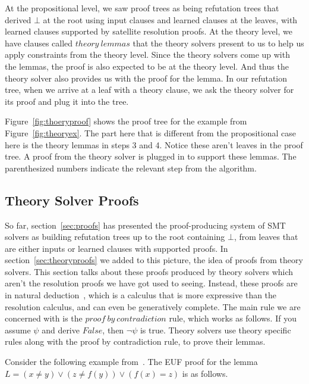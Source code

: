 \documentclass{article}
\begin{document}
At the propositional level, we saw proof trees as being 
refutation trees that derived $\bot$ at the root using
input clauses and learned clauses at the leaves, with 
learned clauses supported by satellite resolution proofs. 
At the theory level, we have clauses called $theory\ lemmas$
that the theory solvers present to us to help us 
apply constraints from the theory level. Since the theory solvers 
come up with the lemmas, the proof is also expected to be 
at the theory level. And thus the theory solver also 
provides us with the proof for the lemma. In our refutation tree,
when we arrive at a leaf with a theory clause, we ask the 
theory solver for its proof and plug it into the tree.

Figure~\ref{fig:thoeryproof} shows the proof tree for 
the example from Figure~\ref{fig:theoryex}. The part here
that is different from the propositional case here is the theory 
lemmas in steps 3 and 4. Notice these aren't leaves in the proof 
tree. A proof from the theory solver is plugged in to support 
these lemmas. The parenthesized numbers indicate the 
relevant step from the algorithm.

\subsection{Theory Solver Proofs}
	\label{sec:theorysolverproofs}
So far, section~\ref{sec:proofs} has presented the 
proof-producing system of SMT solvers as building 
refutation trees up to the root containing $\bot$, 
from leaves that are either inputs or learned clauses 
with supported proofs. In section~\ref{sec:theoryproofs}
we added to this picture, the idea of proofs from 
theory solvers. This section talks about these proofs 
produced by theory solvers which aren't the resolution 
proofs we have got used to seeing. Instead, these 
proofs are in natural deduction~\cite{NatDed}, which 
is a calculus that is more expressive than the 
resolution calculus, and can even be generatively 
complete. The main rule we are concerned with is 
the $proof\ by\ contradiction$ rule, which works as 
follows. If you assume $\psi$ and derive $False$, 
then $\neg \psi$ is true. Theory solvers use 
theory specific rules along with the 
proof by contradiction rule, to prove their lemmas.

Consider the following example 
from~\cite{DBLP:conf/fmcad/KatzBTRH16}.
The EUF proof for the lemma 
$L = (x \neq y) \lor (z \neq f(y)) \lor (f(x) = z)$ is 
as follows. \\
\end{document}
